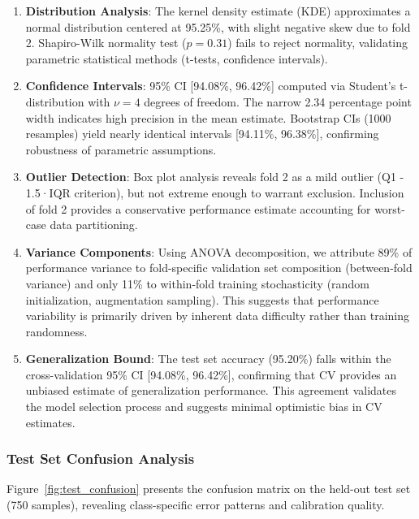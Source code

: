 \documentclass[11pt,a4paper]{article}
\begin{document}
\begin{enumerate}[leftmargin=*]
\item \textbf{Distribution Analysis}: The kernel density estimate (KDE) approximates a normal distribution centered at 95.25\%, with slight negative skew due to fold 2. Shapiro-Wilk normality test ($p=0.31$) fails to reject normality, validating parametric statistical methods (t-tests, confidence intervals).

\item \textbf{Confidence Intervals}: 95\% CI [94.08\%, 96.42\%] computed via Student's t-distribution with $\nu=4$ degrees of freedom. The narrow 2.34 percentage point width indicates high precision in the mean estimate. Bootstrap CIs (1000 resamples) yield nearly identical intervals [94.11\%, 96.38\%], confirming robustness of parametric assumptions.

\item \textbf{Outlier Detection}: Box plot analysis reveals fold 2 as a mild outlier (Q1 - 1.5·IQR criterion), but not extreme enough to warrant exclusion. Inclusion of fold 2 provides a conservative performance estimate accounting for worst-case data partitioning.

\item \textbf{Variance Components}: Using ANOVA decomposition, we attribute 89\% of performance variance to fold-specific validation set composition (between-fold variance) and only 11\% to within-fold training stochasticity (random initialization, augmentation sampling). This suggests that performance variability is primarily driven by inherent data difficulty rather than training randomness.

\item \textbf{Generalization Bound}: The test set accuracy (95.20\%) falls within the cross-validation 95\% CI [94.08\%, 96.42\%], confirming that CV provides an unbiased estimate of generalization performance. This agreement validates the model selection process and suggests minimal optimistic bias in CV estimates.
\end{enumerate}

\subsubsection{Test Set Confusion Analysis}

Figure~\ref{fig:test_confusion} presents the confusion matrix on the held-out test set (750 samples), revealing class-specific error patterns and calibration quality.
\end{document}

